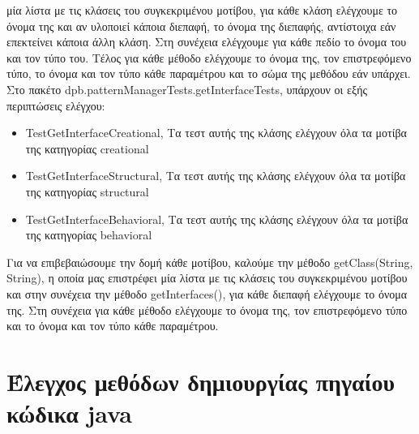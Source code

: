 μία λίστα με τις κλάσεις του συγκεκριμένου μοτίβου, για κάθε κλάση ελέγχουμε το όνομα της και αν υλοποιεί κάποια διεπαφή, 
το όνομα της διεπαφής, αντίστοιχα εάν επεκτείνει κάποια άλλη κλάση. Στη συνέχεια ελέγχουμε για κάθε πεδίο το όνομα του και 
τον τύπο του. Τέλος για κάθε μέθοδο ελέγχουμε το όνομα της, τον επιστρεφόμενο τύπο, 
το όνομα και τον τύπο κάθε παραμέτρου και το σώμα της μεθόδου εάν υπάρχει.
\linebreak
Στο πακέτο dpb.patternManagerTests.getInterfaceTests, υπάρχουν οι εξής περιπτώσεις ελέγχου:
\begin{itemize}
    \item TestGetInterfaceCreational, Τα τεστ αυτής της κλάσης ελέγχουν όλα τα μοτίβα της κατηγορίας creational
    \item TestGetInterfaceStructural, Τα τεστ αυτής της κλάσης ελέγχουν όλα τα μοτίβα της κατηγορίας structural
    \item TestGetInterfaceBehavioral, Τα τεστ αυτής της κλάσης ελέγχουν όλα τα μοτίβα της κατηγορίας behavioral
\end{itemize}
Για να επιβεβαιώσουμε την δομή κάθε μοτίβου, καλούμε την μέθοδο getClass(String, String), η οποία μας επιστρέφει 
μία λίστα με τις κλάσεις του συγκεκριμένου μοτίβου και στην συνέχεια την μέθοδο getInterfaces(), για κάθε διεπαφή 
ελέγχουμε το όνομα της. Στη συνέχεια για κάθε μέθοδο ελέγχουμε το όνομα της, τον επιστρεφόμενο τύπο και
το όνομα και τον τύπο κάθε παραμέτρου.
\section{Έλεγχος μεθόδων δημιουργίας πηγαίου κώδικα java}
\label{sec:patternGeneratorTesting}